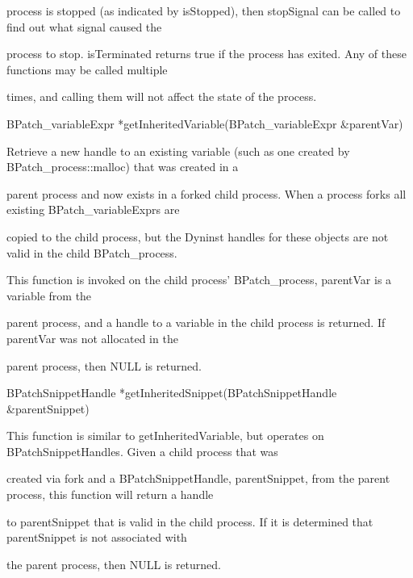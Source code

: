 {{{{{{process is stopped (as indicated by isStopped), then stopSignal can be called to find out what signal caused the

process to stop. isTerminated returns true if the process has exited. Any of these functions may be called multiple

times, and calling them will not affect the state of the process.}





\bigskip



{

BPatch_variableExpr *getInheritedVariable(BPatch_variableExpr &parentVar)



{

Retrieve a new handle to an existing variable (such as one created by BPatch_process::malloc) that was created in a

parent process and now exists in a forked child process. When a process forks all existing BPatch_variableExprs are

copied to the child process, but the Dyninst handles for these objects are not valid in the child BPatch_process.

This function is invoked on the child process' BPatch_process, parentVar is a variable from the

parent process, and a handle to a variable in the child process is returned. If parentVar was not allocated in the

parent process, then NULL is returned.}



{

BPatchSnippetHandle *getInheritedSnippet(BPatchSnippetHandle &parentSnippet)



{

This function is similar to getInheritedVariable, but operates on BPatchSnippetHandles. Given a child process that was

created via fork and a BPatch­SnippetHandle, parentSnippet, from the parent process, this function will return a handle

to parentSnippet that is valid in the child process. If it is determined that parentSnippet is not associated with

the parent process, then NULL is returned.}





}}}}}}}
